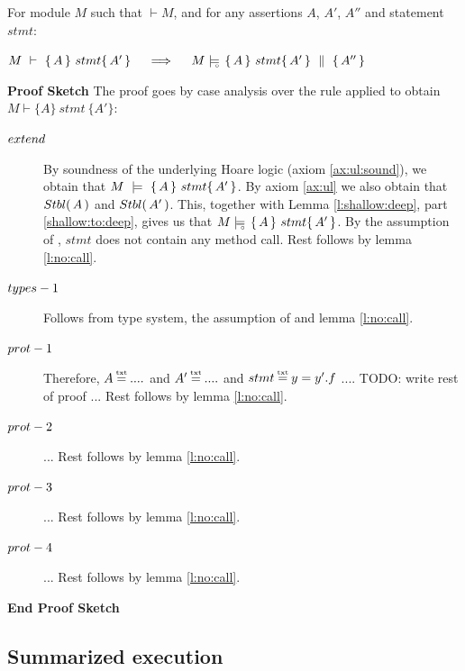 \begin{Theorem}
\label{l:triples:sound}
For module  $M$ %
such that  $\vdash M$, and for any assertions $A$,  $A'$, $A''$ and statement  $stmt$:
\begin{center}
$M\ \vdash\  \triple A {stmt} {A'}  \ \ \ \  \Longrightarrow  \ \ \ \ \satisfiesD {M} {\quadruple {A} {stmt} {A'} {A''}}$
\end{center}
\end{Theorem}
 

\noindent
\vspace{.2cm}
 {\textbf{Proof Sketch}} 
The proof goes by case analysis over the rule applied to obtain $M \vdash \{ A \}\ stmt \  \{ A' \} $:

\begin{description} 

\item[${\sc{extend}}$] 
By  soundness of the underlying Hoare logic (axiom \ref{ax:ul:sound}), we obtain that  $M\ \models\  \{\, A \, \}\ stmt \{\, A' \, \}$.
By axiom \ref{ax:ul} we also obtain that ${Stbl(\, A\, )}$ and  ${Stbl(\, A'\, )}$. 
This, together with   Lemma \ref{l:shallow:deep}, part \ref{shallow:to:deep}, gives us that
$M \models\!\!\!\!_{_{\circ}}\   \{\, A \, \}\ stmt \{\, A' \, \}  $. 
By the assumption of {}, $stmt$ does not contain any method call. Rest follows by lemma \ref{l:no:call}.

\item[${\sc{types-1}}$] 

Follows from type system, the assumption of {} and lemma \ref{l:no:call}.

\item[${\sc{prot-1}}$]  
Therefore, $A \txteq ....$ and $A' \txteq ....$  and $stmt \txteq y=y'.f$ .... TODO: write rest of proof ...
Rest follows by lemma \ref{l:no:call}.
\item[${\sc{prot-2}}$] ... Rest follows by lemma \ref{l:no:call}.

\item[${\sc{prot-3}}$] ... Rest follows by lemma \ref{l:no:call}.

\item[${\sc{prot-4}}$] ... Rest follows by lemma \ref{l:no:call}.

\end{description}
\noindent
\vspace{.1cm}
{\textbf{End Proof Sketch}} 

 
\subsection{Summarized  execution} 
\label{sect:termExecs}

